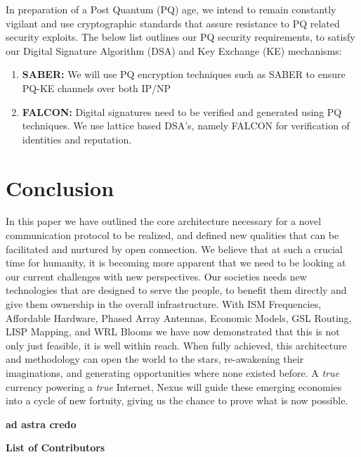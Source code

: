 \documentclass[11pt]{article}
\begin{document}
In preparation of a Post Quantum (PQ) age, we intend to remain constantly vigilant and use cryptographic standards that assure resistance to PQ related security exploits.
The below list outlines our PQ security requirements, to satisfy our Digital Signature Algorithm (DSA) and Key Exchange (KE) mechanisms:

\begin{enumerate}
    \item \textbf{SABER:} We will use PQ encryption techniques such as SABER \cite{SABER} to ensure PQ-KE channels over both IP/NP
    \item \textbf{FALCON:} Digital signatures need to be verified and generated using PQ techniques. We use lattice based DSA's, namely FALCON \cite{FALCON} for verification of identities and reputation.
\end{enumerate}

\section{Conclusion}

In this paper we have outlined the core architecture necessary for a novel communication protocol to be realized, and defined new qualities that can be facilitated and nurtured by open connection.
We believe that at such a crucial time for humanity, it is becoming more apparent that we need to be looking at our current challenges with new perspectives.
Our societies needs new technologies that are designed to serve the people, to benefit them directly and give them ownership in the overall infrastructure.
With ISM Frequencies, Affordable Hardware, Phased Array Antennas, Economic Models, GSL Routing, LISP Mapping, and WRL Blooms we have now demonstrated that this is not only just feasible, it is well within reach.
When fully achieved, this architecture and methodology can open the world to the stars, re-awakening their imaginations, and generating opportunities where none existed before.
A \textit{true} currency powering a \textit{true} Internet, Nexus will guide these emerging economies into a cycle of new fortuity, giving us the chance to prove what is now possible.


\bigskip 
\begin{center}
\textbf{ad astra credo}
\end{center}



\pagebreak
{\noindent\Large\textbf{List of Contributors}}
\bigskip
\end{document}

